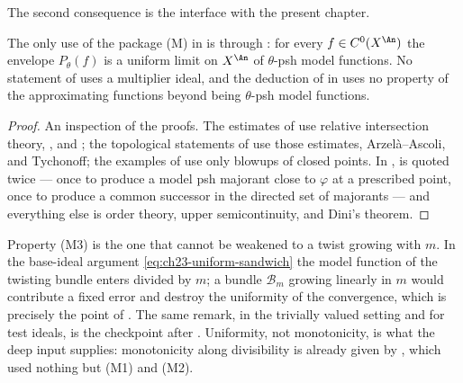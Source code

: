 The second consequence is the interface with the present chapter.

\begin{proposition}
\label{prop:ch22-multiplier-interface}
The only use of the package \textup{(M)} in
 is through
: for every \(f\in C^0(X^{\An})\) the
envelope \(P_\theta(f)\) is a uniform limit on \(X^{\An}\) of
\(\theta\)-psh model functions.  No statement of
 uses a multiplier ideal, and the deduction
of  in
 uses no property of the approximating
functions beyond being \(\theta\)-psh model functions.
\end{proposition}

\begin{proof}
An inspection of the proofs.  The estimates of
 use relative intersection theory,
, and ; the
topological statements of
 use those estimates, Arzel\`a--Ascoli, and
Tychonoff; the examples of  use only blowups of closed
points.  In ,
 is quoted twice --- once to produce a
model psh majorant close to \(\varphi\) at a prescribed point, once to
produce a common successor in the directed set of majorants --- and
everything else is order theory, upper semicontinuity, and Dini's theorem.
\end{proof}

\begin{remark}
\label{rem:ch22-fixed-twist}
Property (M3) is the one that cannot be weakened to a twist growing with
\(m\).  In the base-ideal argument
\eqref{eq:ch23-uniform-sandwich} the model function of the twisting bundle
enters divided by \(m\); a bundle \(\mathcal B_m\) growing linearly in
\(m\) would contribute a fixed error and destroy the uniformity of the
convergence, which is precisely the point of
.  The same remark, in the
trivially valued setting and for test ideals, is the checkpoint after
.  Uniformity, not
monotonicity, is what the deep input supplies: monotonicity along
divisibility is already given by
, which used nothing but (M1) and (M2).
\end{remark}

